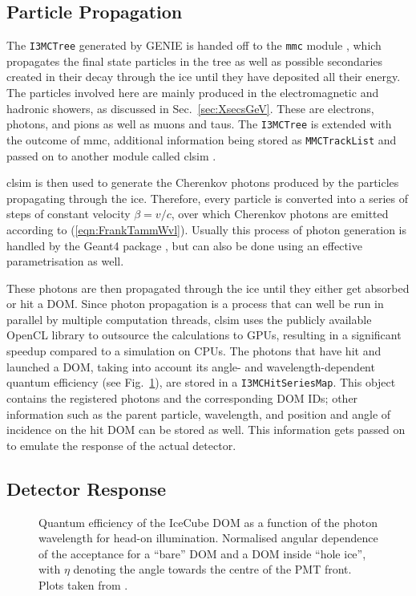 \subsection{Particle Propagation}
\label{sec:MC_propagation}

The \texttt{I3MCTree} generated by GENIE is handed off to the \texttt{mmc}
module \cite{mmc}, which propagates the final state particles in the tree as
well as possible secondaries created in their decay through the ice until they
have deposited all their energy. The particles involved here are mainly 
produced in the electromagnetic and hadronic showers, as discussed in
Sec.~\ref{sec:XsecsGeV}. These are electrons, photons, and pions as well as
muons and taus. The \texttt{I3MCTree} is extended with the outcome of
mmc, additional information being stored as \texttt{MMCTrackList} and
passed on to another module called clsim \cite{clsim}.

clsim is then used to generate the Cherenkov photons produced by
the particles propagating through the ice. Therefore, every
particle is converted into a series of steps of constant velocity $\beta =
v/c$, over which Cherenkov photons are emitted according to
(\ref{eqn:FrankTammWvl}). Usually this process of photon generation is handled
by the Geant4 package \cite{Geant4_1, Geant4_2}, but can also be done using an
effective parametrisation as well.

These photons are then propagated through the ice until they either get absorbed
or hit a DOM. Since photon propagation is a process that can well be run in 
parallel by multiple computation threads, clsim uses the publicly
available OpenCL library \cite{OpenCL} to outsource the calculations to GPUs,
resulting in a significant speedup compared to a simulation on CPUs. The photons
that have hit and launched a DOM, taking into account its angle- and
wavelength-dependent quantum efficiency (see Fig.~\ref{fig:DOMeff}), are stored
in a \texttt{I3MCHitSeriesMap}. This object contains the registered photons and
the corresponding DOM IDs; other information such as the parent particle,
wavelength, and position and angle of incidence on the hit DOM can be stored as
well. This information gets passed on to emulate the response of the actual
detector.

\subsection{Detector Response}
\label{sec:MC_detector}

\begin{figure}[ht]
\centering
  \caption{\protect{} Quantum efficiency of the IceCube DOM
        as a function of the photon wavelength for head-on illumination.
        \protect{} Normalised angular dependence of the
        acceptance for a ``bare'' DOM and a DOM inside ``hole ice'', with
        $\eta$ denoting the angle towards the centre of the PMT front. Plots
        taken from \cite{Dima}.}
\label{fig:DOMeff}
\end{figure}

